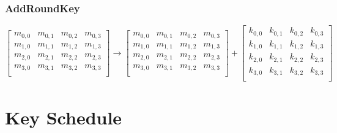 \subsubsection{AddRoundKey}
\[
\begin{bmatrix}
	m_{0,0}&m_{0,1}&m_{0,2}&m_{0,3}\\
	m_{1,0}&m_{1,1}&m_{1,2}&m_{1,3}\\
	m_{2,0}&m_{2,1}&m_{2,2}&m_{2,3}\\
	m_{3,0}&m_{3,1}&m_{3,2}&m_{3,3}\\
\end{bmatrix}
\rightarrow
\begin{bmatrix}
	m_{0,0}&m_{0,1}&m_{0,2}&m_{0,3}\\
	m_{1,0}&m_{1,1}&m_{1,2}&m_{1,3}\\
	m_{2,0}&m_{2,1}&m_{2,2}&m_{2,3}\\
	m_{3,0}&m_{3,1}&m_{3,2}&m_{3,3}\\
\end{bmatrix}
+
\begin{bmatrix}
	k_{0,0}&k_{0,1}&k_{0,2}&k_{0,3}\\
	k_{1,0}&k_{1,1}&k_{1,2}&k_{1,3}\\
	k_{2,0}&k_{2,1}&k_{2,2}&k_{2,3}\\
	k_{3,0}&k_{3,1}&k_{3,2}&k_{3,3}\\
\end{bmatrix}
\]
\section{Key Schedule}
